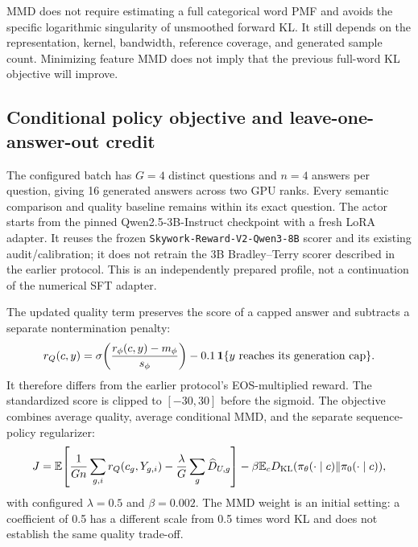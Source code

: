 MMD does not require estimating a full categorical word PMF and avoids
the specific logarithmic singularity of unsmoothed forward KL. It still
depends on the representation, kernel, bandwidth, reference coverage,
and generated sample count. Minimizing feature MMD does not imply that
the previous full-word KL objective will improve.

\subsection{Conditional policy objective and leave-one-answer-out credit}
The configured batch has $G=4$ distinct questions and $n=4$ answers per
question, giving 16 generated answers across two GPU ranks. Every
semantic comparison and quality baseline remains within its exact
question. The actor starts from the pinned Qwen2.5-3B-Instruct checkpoint
with a fresh LoRA adapter. It reuses the frozen
\texttt{Skywork-Reward-V2-Qwen3-8B} scorer and its existing audit/calibration;
it does not retrain the 3B Bradley--Terry scorer described in the earlier
protocol. This is an independently prepared profile, not a continuation
of the numerical SFT adapter.

The updated quality term preserves the score of a capped answer and
subtracts a separate nontermination penalty:
\begin{equation}
 r_Q(c,y)=\sigma\!\left(\frac{r_\phi(c,y)-m_\phi}{s_\phi}\right)
             -0.1\,\mathbf{1}\{y\text{ reaches its generation cap}\}.
 \label{eq:mmdquality}
\end{equation}
It therefore differs from the earlier protocol's EOS-multiplied reward.
The standardized score is clipped to $[-30,30]$ before the sigmoid.
The objective combines average quality, average conditional MMD, and
the separate sequence-policy regularizer:
\begin{equation}
 J=\mathbb{E}\!\left[\frac1{Gn}\sum_{g,i}r_Q(c_g,Y_{g,i})
          -\frac{\lambda}{G}\sum_g\widehat D_{U,g}\right]
       -\beta\mathbb{E}_cD_{\mathrm{KL}}(\pi_\theta(\cdot\mid c)\Vert\pi_0(\cdot\mid c)),
 \label{eq:mmdobjective}
\end{equation}
with configured $\lambda=0.5$ and $\beta=0.002$.
The MMD weight is an initial setting: a coefficient of 0.5 has a different
scale from 0.5 times word KL and does not establish the same quality trade-off.

